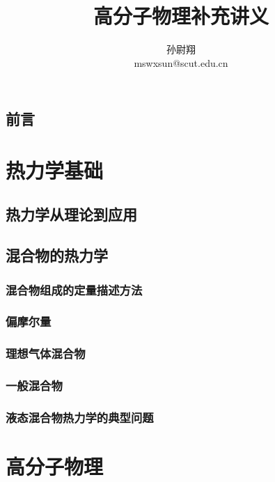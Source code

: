 \documentclass[zihao=5,linespread=1.3,a4paper,heading=true,twoside]{ctexbook}
\title{高分子物理补充讲义}
\author{孙尉翔\\mswxsun@scut.edu.cn}
\theoremstyle{definition}
\theoremstyle{plain}
\begin{document}
\maketitle
\chapter*{前言}\label{sec:preface}


\newpage\tableofcontents

\part{热力学基础}
\chapter{热力学从理论到应用}\label{sec:I_thermodynamic_relations}


\chapter{混合物的热力学}\label{sec:II 混合物的热力学}
\section{混合物组成的定量描述方法}\label{sec:II.1 composition_measures}

\section{偏摩尔量}\label{sec:II.2 partial_molar_quantities}

\section{理想气体混合物}\label{sec:II.3 ideal_mixture.tex}

\section{一般混合物}\label{sec:II.4 real_mixture}

\section{液态混合物热力学的典型问题}\label{sec:II.5 typical_problems}


\part{高分子物理}
\end{document}
